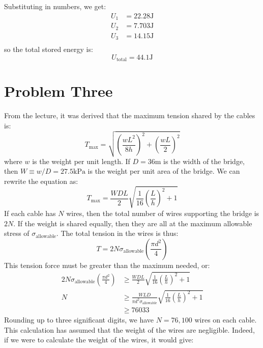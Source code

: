 \documentclass{article}
\begin{document}
Substituting in numbers, we get:
\begin{align}
    U_1 &= 22.28 \si{\joule}\\ 
    U_2 &= 7.703 \si{\joule}\\ 
    U_3 &= 14.15 \si{\joule}\\
    \label{eq:}
\end{align}
so the total stored energy is:
\begin{equation}
    U_\text{total}=44.1\si{\joule}
    \label{eq:}
\end{equation}

\newpage
\section{Problem Three}
From the lecture, it was derived that the maximum tension shared by the cables is:
\begin{equation}
    T_\text{max} = \sqrt{\left(\frac{wL^2}{8h}\right)^2+\left(\frac{wL}{2}\right)^2}
    \label{eq:}
\end{equation}
where $w$ is the weight per unit length. If $D=36\si{\meter}$ is the width of the bridge, then $W\equiv w/D=27.5\si{\kilo\pascal}$ is the weight per unit area of the bridge. We can rewrite the equation as:
\begin{equation}
    T_\text{max} = \frac{WDL}{2}\sqrt{\frac{1}{16}\left(\frac{L}{h}\right)^2+1}
    \label{eq:}
\end{equation}
If each cable has $N$ wires, then the total number of wires supporting the bridge is $2N$. If the weight is shared equally, then they are all at the maximum allowable stress of $\sigma_\text{allowable}$. The total tension in the wires is thus:
\begin{equation}
    T = 2N\sigma_\text{allowable}\left(\frac{\pi d^2}{4}\right)
    \label{eq:}
\end{equation}
This tension force must be greater than the maximum needed, or:
\begin{align}
    2N\sigma_\text{allowable}\left(\frac{\pi d^2}{4}\right) &\ge \frac{WDL}{2}\sqrt{\frac{1}{16}\left(\frac{L}{h}\right)^2+1} \\ 
    N &\ge \frac{WLD}{\pi d^2\sigma_\text{allowable}}\sqrt{\frac{1}{16}\left(\frac{L}{h}\right)^2+1} \label{eq:max wires for 3}\\
    &\ge 76033
    \label{eq:}
\end{align}
Rounding up to three significant digits, we have $\boxed{N=76,100}$ wires on each cable. This calculation has assumed that the weight of the wires are negligible. Indeed, if we were to calculate the weight of the wires, it would give:
\end{document}
